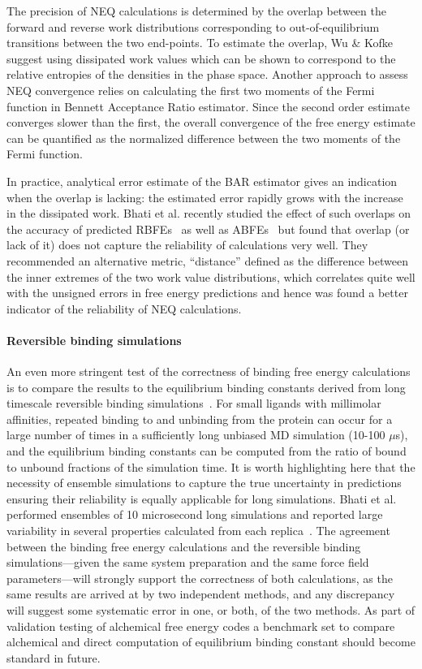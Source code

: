 \documentclass[9pt,bestpractices]{livecoms}
\begin{document}
The precision of NEQ calculations is determined by the overlap between the forward and reverse work distributions corresponding to out-of-equilibrium transitions between the two end-points. To estimate the overlap, Wu \& Kofke suggest using dissipated work values which can be shown to correspond to the relative entropies of the densities in the phase space. \cite{wu2005phase} Another approach to assess NEQ convergence relies on calculating the first two moments of the Fermi function in Bennett Acceptance Ratio estimator. \cite{hahn2010measuring} Since the second order estimate converges slower than the first, the overall convergence of the free energy estimate can be quantified as the normalized difference between the two moments of the Fermi function. 

In practice, analytical error estimate of the BAR estimator \cite{shirts2003equilibrium} gives an indication when the overlap is lacking: the estimated error rapidly grows with the increase in the dissipated work. \cite{shirts2005comparison} Bhati et al. recently studied the effect of such overlaps on the accuracy of predicted RBFEs~\cite{wan2023eqvsneq} as well as ABFEs~\cite{bhati2025} but found that overlap (or lack of it) does not capture the reliability of calculations very well. They recommended an alternative metric, ``distance'' defined as the difference between the inner extremes of the two work value distributions, which correlates quite well with the unsigned errors in free energy predictions and hence was found a better indicator of the reliability of NEQ calculations. 

\paragraph{Reversible binding simulations}
An even more stringent test of the correctness of binding free energy calculations is to compare the results to the equilibrium binding constants derived from long timescale reversible binding simulations~\cite{pan2017quantitative}. For small ligands with millimolar affinities, repeated binding to and unbinding from the protein can occur for a large number of times in a sufficiently long unbiased MD simulation (10-100 $\mu$s), and the equilibrium binding constants can be computed from the ratio of bound to unbound fractions of the simulation time. 
It is worth highlighting here that the necessity of ensemble simulations to capture the true uncertainty in predictions ensuring their reliability is equally applicable for long simulations. Bhati et al. performed ensembles of 10 microsecond long simulations and reported large variability in several properties calculated from each replica~\cite{bhati2023}.
The agreement between the binding free energy calculations and the reversible binding simulations---given the same system preparation and the same force field parameters---will strongly support the correctness of both calculations, as the same results are arrived at by two independent methods, and any discrepancy will suggest some systematic error in one, or both, of the two methods. As part of validation testing of alchemical free energy codes a benchmark set to compare alchemical and direct computation of equilibrium binding constant should become standard in future.
\end{document}
